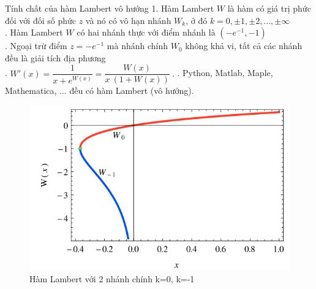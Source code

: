 \documentclass[10pt,notheorems]{beamer}
\theoremstyle{definition}
\theoremstyle{definition}
\theoremstyle{definition}
\begin{document}
\begin{frame}{}
\begin{minipage}{6.5cm}
\begin{block}{Tính chất của hàm Lambert vô hướng}
1. Hàm Lambert $W$ là hàm có giá trị phức đối với đối số phức $z$ và nó có vô hạn nhánh $W_{k}$, ở đó $k = 0,\pm 1,\pm 2,...,\pm\infty$\\. Hàm Lambert $W$ có hai nhánh thực với điểm nhánh là $(-e^{-1},-1)$\\. Ngoại trừ điểm $z=-e^{-1}$ mà nhánh chính $W_0$ không khả vi, tất cả các nhánh đều là giải tích địa phương\\. 	$ W'(x) = \dfrac{1}{x+e^{W(x)}} = \dfrac{W(x)}{x \ (1+W(x))} \ .$ . Python, Matlab, Maple, Mathematica, ... đều có hàm Lambert (vô hướng).\pause
\end{block}	
\end{minipage}
\hfill
\begin{minipage}{5cm}
			\begin{figure}[h]
			\centering
			\includegraphics[scale=0.3]{hinh/Screenshot_1}
			\caption{Hàm Lambert với 2 nhánh chính k=0, k=-1}
			\label{fig1}
		\end{figure}
	\end{minipage}
\end{frame}
\end{document}
